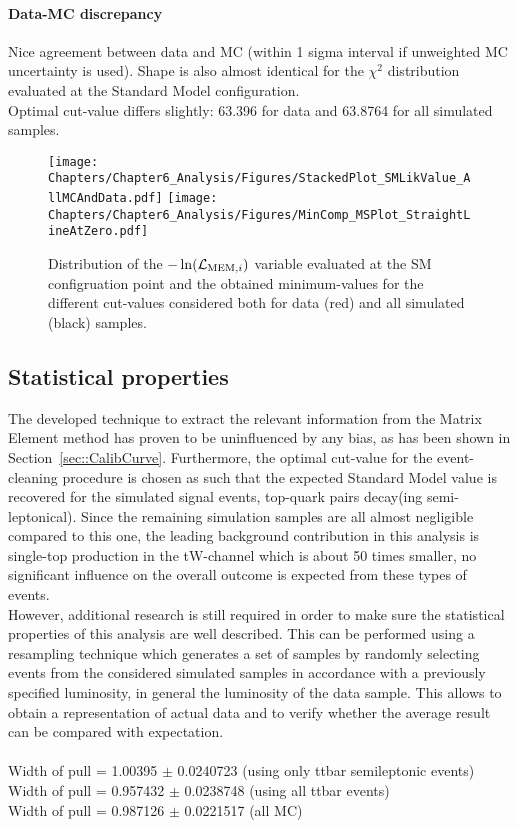 \paragraph{Data-MC discrepancy}
Nice agreement between data and MC (within 1 sigma interval if unweighted MC uncertainty is used). 
Shape is also almost identical for the $\chi^{2}$ distribution evaluated at the Standard Model configuration.\\
Optimal cut-value differs slightly: 63.396 for data and 63.8764 for all simulated samples.

\begin{figure}[h!t]
 \centering
 \texttt{[image: Chapters/Chapter6\_Analysis/Figures/StackedPlot\_SMLikValue\_AllMCAndData.pdf]}
 \texttt{[image: Chapters/Chapter6\_Analysis/Figures/MinComp\_MSPlot\_StraightLineAtZero.pdf]}            %
 \caption{Distribution of the $-\ln(\mathcal{L}_{\textrm{MEM}, i})$ variable evaluated at the SM configruation point and the obtained minimum-values for the different cut-values considered both for data (red) and all simulated (black) samples.}
\end{figure}

\subsection{Statistical properties}
The developed technique to extract the relevant information from the Matrix Element method has proven to be uninfluenced by any bias, as has been shown in Section~\ref{sec::CalibCurve}.
Furthermore, the optimal cut-value for the event-cleaning procedure is chosen as such that the expected Standard Model value is recovered for the simulated signal events, top-quark pairs decay(ing semi-leptonical). Since the remaining simulation samples are all almost negligible compared to this one, the leading background contribution in this analysis is single-top production in the tW-channel which is about 50 times smaller, no significant influence on the overall outcome is expected from these types of events.
\\

However, additional research is still required in order to make sure the statistical properties of this analysis are well described.
This can be performed using a resampling technique which generates a set of samples by randomly selecting events from the considered simulated samples in accordance with a previously specified luminosity, in general the luminosity of the data sample.
This allows to obtain a representation of actual data and to verify whether the average result can be compared with expectation.
\\
\\
Width of pull = 1.00395 $\pm$ 0.0240723 (using only ttbar semileptonic events)\\
Width of pull = 0.957432 $\pm$ 0.0238748 (using all ttbar events)\\
Width of pull = 0.987126 $\pm$ 0.0221517 (all MC)

